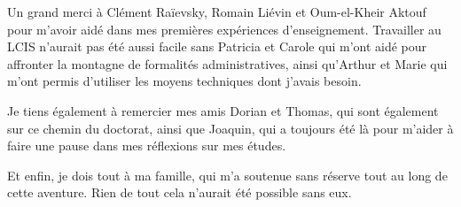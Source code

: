 Un grand merci à Clément Raïevsky, Romain Liévin et Oum-el-Kheir Aktouf pour m'avoir aidé dans mes premières expériences d'enseignement. Travailler au LCIS n'aurait pas été aussi facile sans Patricia et Carole qui m'ont aidé pour affronter la montagne de formalités administratives, ainsi qu'Arthur et Marie qui m'ont permis d'utiliser les moyens techniques dont j'avais besoin.

Je tiens également à remercier mes amis Dorian et Thomas, qui sont également sur ce chemin du doctorat, ainsi que Joaquin, qui a toujours été là pour m'aider à faire une pause dans mes réflexions sur mes études.

Et enfin, je dois tout à ma famille, qui m'a soutenue sans réserve tout au long de cette aventure. Rien de tout cela n'aurait été possible sans eux.


\endgroup




